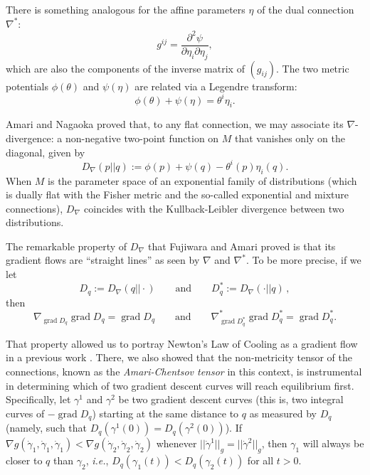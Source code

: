 \documentclass{amsart}
\theoremstyle{definition}
\begin{document}
There is something analogous for the affine parameters $\eta$ of the dual connection $\nabla^*$:
\begin{equation*}
    g^{ij}=\frac{\partial^2\psi}{\partial\eta_i\partial\eta_j},
\end{equation*}
which are also the components of the inverse matrix of $(g_{ij})$. The two metric potentials 
$\phi(\theta)$ and $\psi(\eta)$
are related via a Legendre transform: 
\begin{equation*}
    \phi(\theta)+\psi(\eta)=\theta^i\eta_i.
\end{equation*}

Amari and Nagaoka \cite{amari_methods_2007} proved that, to any flat connection, 
we may associate its $\nabla$-divergence: a non-negative two-point function on $M$ that vanishes only on the diagonal, given by
\begin{equation*}
    D_\nabla(p||q):=\phi(p)+\psi(q)-\theta^i(p)\eta_i(q).
\end{equation*}
When $M$ is the parameter space of an exponential family of distributions (which is dually flat with the Fisher metric and the so-called exponential and mixture connections), $D_\nabla$ coincides with the Kullback-Leibler divergence between two distributions. 

The remarkable property of $D_\nabla$ that Fujiwara and Amari \cite{fujiwara_gradient_1995} proved is that its gradient flows are ``straight lines'' as seen by $\nabla$ and $\nabla^*$. To be more precise, if we let 
$$D_q:=D_\nabla(q||\cdot) \qquad \text{and} \qquad D_q^*:=D_\nabla(\cdot||q)\,,$$ 
then
\begin{equation*}
    \nabla_{\operatorname{grad}D_q}\operatorname{grad}D_q=\operatorname{grad}D_q\qquad \text{and}\qquad \nabla^*_{\operatorname{grad}D_q^*}\operatorname{grad}D_q^*=\operatorname{grad}D_q^*.
\end{equation*}

That property allowed us to portray Newton's Law of Cooling as 
a gradient flow in a previous work \cite{bravetti_asymmetric_2025}. 
There, we also showed that the non-metricity tensor of the connections, 
known as the \textit{Amari-Chentsov tensor} in this context, 
is instrumental in determining which of two gradient descent curves will reach equilibrium first. 
Specifically, let $\gamma^1$ and $\gamma^2$ be two gradient descent curves 
(this is, two integral curves of $-\operatorname{grad} D_q$)
starting at the same distance to $q$ as measured by $D_q$ 
(namely, such that $D_q(\gamma^1(0))=D_q(\gamma^2(0))$). 
If $\nabla g(\dot\gamma_1,\dot\gamma_1,\dot\gamma_1)<\nabla g(\dot\gamma_2,\dot\gamma_2,\dot\gamma_2)$
whenever $||\dot\gamma^1||_g=||\dot\gamma^2||_g$,
then $\gamma_1$ will always be closer to $q$ than $\gamma_2$,
\textit{i.e.}, $D_q(\gamma_1(t))<D_q(\gamma_2(t))$ for all $t>0$.
\end{document}
